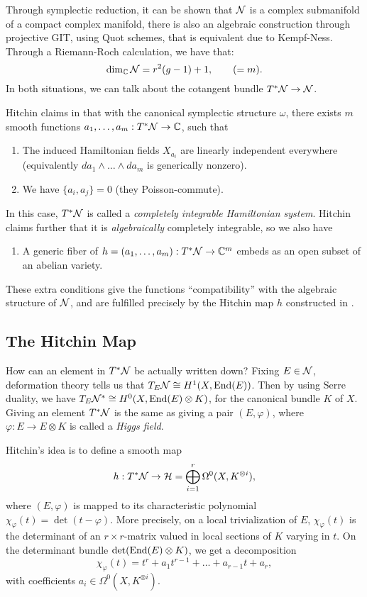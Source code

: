 Through symplectic reduction, it can be shown that $\mathcal{N}$ is a complex submanifold of a compact complex manifold, there is also an algebraic construction through projective GIT, using Quot schemes, that is equivalent due to Kempf-Ness. Through a Riemann-Roch calculation, we have that:
\begin{equation}
\dim_{\mathbb{C}}{\mathcal{N}}=r^2(g-1)+1,\qquad(=m).
\end{equation}
In both situations, we can talk about the cotangent bundle $T^*\mathcal{N}\rightarrow\mathcal{N}$.

Hitchin claims in \cite{hitch} that with the canonical symplectic structure $\omega$, there exists $m$ smooth functions $a_1,\ldots,a_m:T^*\mathcal{N}\rightarrow\mathbb{C}$, such that
\begin{enumerate}[label=(\alph*)]
    \item The induced Hamiltonian fields $X_{a_i}$ are linearly independent everywhere (equivalently $da_1\wedge\ldots\wedge da_m$ is generically nonzero).
    \item We have $\{a_i,a_j\}=0$ (they Poisson-commute).
\end{enumerate}
In this case, $T^*\mathcal{N}$ is called a \textit{completely integrable Hamiltonian system}. Hitchin claims further that it is \textit{algebraically} completely integrable, so we also have
\begin{enumerate}[label=(\alph*),resume]
    \item A generic fiber of $h=(a_1,\ldots,a_m):T^*\mathcal{N}\rightarrow\mathbb{C}^m$ embeds as an open subset of an abelian variety.
\end{enumerate}

These extra conditions give the functions ``compatibility'' with the algebraic structure of $\mathcal{N}$, and are fulfilled precisely by the Hitchin map $h$ constructed in \cite{hitch}.

\subsection{The Hitchin Map}

How can an element in $T^*\mathcal{N}$ be actually written down? Fixing $E\in\mathcal{N}$, deformation theory tells us that $T_E\mathcal{N}\cong H^1(X,\text{End}(E))$. Then by using Serre duality, we have $T_E\mathcal{N}^*\cong H^0(X,\text{End}(E)\otimes K)$, for the canonical bundle $K$ of $X$. Giving an element $T^*\mathcal{N}$ is the same as giving a pair $(E,\varphi)$, where $\varphi:E\rightarrow E\otimes K$ is called a \textit{Higgs field}.

Hitchin's idea is to define a smooth map
\begin{equation}
h:T^*\mathcal{N}\rightarrow\mathcal{H}=\bigoplus_{i=1}^r\Omega^0(X,K^{\otimes i}),
\end{equation}
where $(E,\varphi)$ is mapped to its characteristic polynomial $\chi_\varphi(t)=\det(t-\varphi)$. More precisely, on a local trivialization of $E$, $\chi_\varphi(t)$ is the determinant of an $r\times r$-matrix valued in local sections of $K$ varying in $t$. On the determinant bundle $\text{det}(\text{End}(E)\otimes K)$, we get a decomposition
\begin{equation}
    \chi_\varphi(t)=t^r+a_1t^{r-1}+\ldots+a_{r-1}t+a_r,
\end{equation}
with coefficients $a_i\in\Omega^0(X,K^{\otimes i})$.

